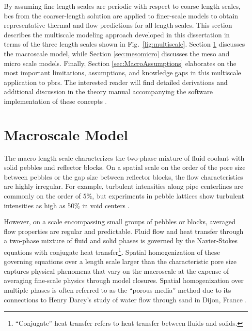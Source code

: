 By assuming fine length scales are periodic with respect to coarse length scales, \glspl{bc} from the coarser-length solution are applied to finer-scale models to obtain representative thermal and flow predictions for all length scales. This section describes the multiscale modeling approach developed in this dissertation in terms of the three length scales shown in Fig.\ \ref{fig:multiscale}. Section \ref{sec:macro_deriv} discusses the macroscale model, while Section \ref{sec:mesomicro} discusses the meso and micro scale models. Finally, Section \ref{sec:MacroAssumptions} elaborates on the most important limitations, assumptions, and knowledge gaps in this multiscale application to \glspl{pbr}. The interested reader will find detailed derivations and additional discussion in the theory manual accompanying the software implementation of these concepts \cite{novak_manual}. 

\section{Macroscale Model}
\label{sec:macro_deriv}

The macro length scale characterizes the two-phase mixture of fluid coolant with solid pebbles and reflector blocks. On a spatial scale on the order of the pore size between pebbles or the gap size between reflector blocks, the flow characteristics are highly irregular. For example, turbulent intensities along pipe centerlines are commonly on the order of 5\%, but experiments in pebble lattices show turbulent intensities as high as 50\% in void centers \cite{mickley}. 

However, on a scale encompassing small groups of pebbles or blocks, averaged flow properties are regular and predictable. Fluid flow and heat transfer through a two-phase mixture of fluid and solid phases is governed by the Navier-Stokes equations with conjugate heat transfer\hspace{0.02cm}\footnote{``Conjugate'' heat transfer refers to heat transfer between fluids and solids.}. Spatial homogenization of these governing equations over a length scale larger than the characteristic pore size captures physical phenomena that vary on the macroscale at the expense of averaging fine-scale physics through model closures. Spatial homogenization over multiple phases is often referred to as the ``porous media'' method due to its connections to Henry Darcy's study of water flow through sand in Dijon, France \cite{darcy}.

